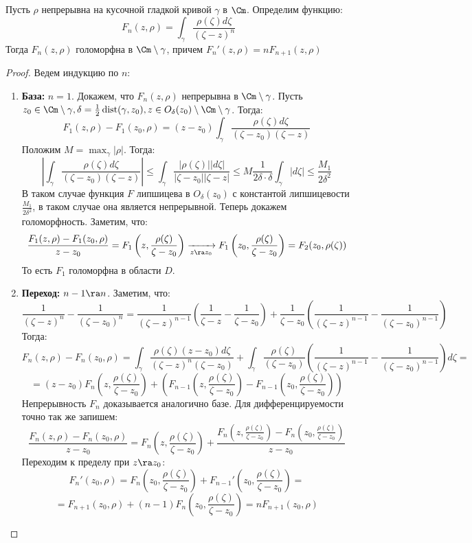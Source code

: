 \begin{theorem}
    Пусть \(\rho\) непрерывна на  кусочной гладкой кривой \(\gamma\) в \(\Cm\). Определим функцию:
    \[F_n(z, \rho) = \int_\gamma \frac{\rho(\zeta)d\zeta}{(\zeta - z)^n}\]
    Тогда \(F_n(z, \rho)\) голоморфна в \(\Cm \setminus \gamma\), причем \(F_n'(z, \rho) = nF_{n + 1}(z, \rho)\)
\end{theorem}
\begin{proof}
    Ведем индукцию по \(n\):
    \begin{enumerate}
        \item[] \textbf{База:} \(n = 1\). Докажем, что \(F_n(z, \rho)\) непрерывна в \(\Cm \setminus \gamma\). Пусть \(z_0 \in \Cm \setminus \gamma, \delta = \frac{1}{2}\operatorname{dist}(\gamma, z_0), z \in O_\delta(z_0) \setminus \Cm \setminus \gamma\). Тогда:
        \[F_1(z, \rho) - F_1(z_0, \rho) = (z - z_0)\int_\gamma \frac{\rho(\zeta)d\zeta}{(\zeta - z_0)(\zeta - z)}\]
        Положим \(M = \max_\gamma |\rho|\). Тогда:
        \[\left| \int_\gamma \frac{\rho(\zeta)d\zeta}{(\zeta - z_0)(\zeta - z)} \right| \le \int_\gamma \frac{|\rho(\zeta)||d\zeta|}{|\zeta - z_0||\zeta - z|} \le M \frac{1}{2\delta \cdot \delta} \int_\gamma |d \zeta| \le \frac{M_1}{2\delta^2}\]
        В таком случае функция \(F\) липшицева в \(O_\delta(z_0)\) с константой липшицевости \(\frac{M_1}{2\delta^2}\), в таком случае она является непрерывной. Теперь докажем голоморфность. Заметим, что:
        \[\frac{F_1(z, \rho) - F_1(z_0, \rho)}{z - z_0} = F_1\left( z, \frac{\rho(\zeta)}{\zeta - z_0} \right) \xrightarrow[z \ra z_0]{}F_1\left( z_0, \frac{\rho(\zeta)}{\zeta - z_0} \right) = F_2(z_0, \rho(\zeta))\]
        То есть \(F_1\) голоморфна в области \(D\).
        \item[] \textbf{Переход:} \(n - 1 \ra n\). Заметим, что:
        \[\frac{1}{(\zeta - z)^n} - \frac{1}{(\zeta - z_0)^n} = \frac{1}{(\zeta - z)^{n - 1}}\left( \frac{1}{\zeta - z} - \frac{1}{\zeta - z_0} \right) + \frac{1}{\zeta - z_0}\left( \frac{1}{(\zeta - z)^{n - 1}} - \frac{1}{(\zeta - z_0)^{n - 1}} \right)\]
        Тогда:
        \[F_n(z, \rho) - F_n(z_0, \rho) = \int_\gamma \frac{\rho(\zeta)(z - z_0)d\zeta}{(\zeta - z)^n(\zeta - z_0)} + \int_\gamma \frac{\rho(\zeta)}{(\zeta - z_0)}\left( \frac{1}{(\zeta - z)^{n - 1}} - \frac{1}{(\zeta - z_0)^{n - 1}} \right)d\zeta =\]
        \[= (z - z_0)F_n\left( z, \frac{\rho(\zeta)}{\zeta - z_0} \right) + \left( F_{n - 1}\left(z, \frac{\rho(\zeta)}{\zeta - z_0}\right) - F_{n - 1}\left( z_0, \frac{\rho(\zeta)}{\zeta - z_0} \right) \right)\]
        Непрерывность \(F_n\) доказывается аналогично базе. Для дифференцируемости точно так же запишем:
        \[\frac{F_n(z, \rho) - F_n(z_0, \rho)}{z - z_0} = F_n\left( z, \frac{\rho(\zeta)}{\zeta - z_0} \right) + \frac{F_n\left(z, \frac{\rho(\zeta)}{\zeta - z_0}\right) - F_n\left(z_0, \frac{\rho(\zeta)}{\zeta - z_0}\right)}{z - z_0}\]
        Переходим к пределу при \(z \ra z_0\):
        \[F_n'(z_0, \rho) = F_n\left( z_0, \frac{\rho(\zeta)}{\zeta - z_0} \right) + F_{n - 1}'\left( z_0, \frac{\rho(\zeta)}{\zeta - z_0} \right) = \]
        \[= F_{n + 1}(z_0, \rho) + (n - 1)F_n\left( z_0, \frac{\rho(\zeta)}{\zeta - z_0} \right) = nF_{n + 1}(z_0, \rho)\]
    \end{enumerate}
\end{proof}

